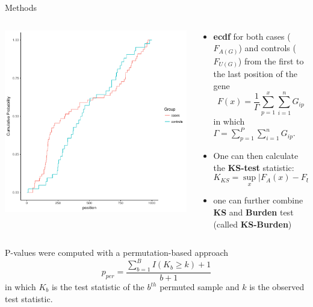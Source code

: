 \documentclass{beamer}
\begin{document}
\begin{frame}[t]{Methods}
  \tiny
  \begin{columns}
    \begin{column}{0.5\textwidth}
      \includegraphics[width=0.9\linewidth]{plots/ks_example.pdf}
    \end{column}
    \begin{column}{0.5\textwidth}
      \begin{itemize}
        \item \textbf{ecdf} for both cases ($F_{A(G)}$) and controls ($F_{U(G)}$) from the first to the last position of the gene 
          \begin{equation}
            F(x) = \frac{1}{\Gamma} \sum^x_{p=1}\sum^n_{i=1}G_{ip}
          \end{equation}
          in which $\Gamma = \sum^P_{p=1}\sum^n_{i=1} G_{ip}$.
        \item One can then calculate the \textbf{KS-test} statistic:
          \begin{equation}
            K_{KS} = \sup_x | F_A(x) - F_U(x) |
          \end{equation}
        \item one can further combine \textbf{KS} and \textbf{Burden} test (called \textbf{KS-Burden})
      \end{itemize}
    \end{column}
  \end{columns}
  \begin{center}
    P-values were computed with a permutation-based approach
    \begin{equation}
      p_{per} = \frac{\sum^B_{b=1} I(K_b \geq k)+1}{b+1}
    \end{equation}
    in which $K_b$ is the test statistic of the $b^{th}$ permuted sample and $k$ is the observed test statistic.
  \end{center}
\end{frame}
\end{document}

